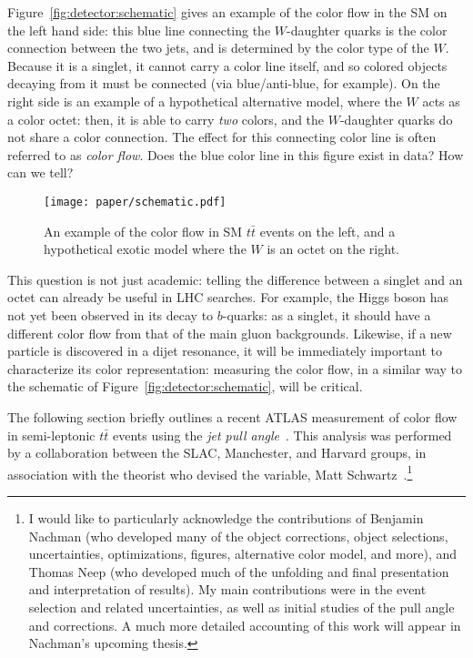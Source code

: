Figure~\ref{fig:detector:schematic} gives an example of the color flow in the SM on the left hand side: this blue line connecting the $W$-daughter quarks is the color connection between the two jets, and is determined by the color type of the $W$. Because it is a singlet, it cannot carry a color line itself, and so colored objects decaying from it must be connected (via blue/anti-blue, for example). On the right side is an example of a hypothetical alternative model, where the $W$ acts as a color octet: then, it is able to carry \textit{two} colors, and the $W$-daughter quarks do not share a color connection. The effect for this connecting color line is often referred to as \textit{color flow}. Does the blue color line in this figure exist in data? How can we tell? 


\begin{figure}
\centering
\texttt{[image: paper/schematic.pdf]}
\label{fig:color:motivation:schematic}
\caption{An example of the color flow in SM $t\bar{t}$ events on the left, and a hypothetical exotic model where the $W$ is an octet on the right.}
\end{figure}


This question is not just academic: telling the difference between a singlet and an octet can already be useful in LHC searches. For example, the Higgs boson has not yet been observed in its decay to $b$-quarks: as a singlet, it should have a different color flow from that of the main gluon backgrounds. Likewise, if a new particle is discovered in a dijet resonance, it will be immediately important to characterize its color representation: measuring the color flow, in a similar way to the schematic of Figure~\ref{fig:detector:schematic}, will be critical. 

The following section briefly outlines a recent ATLAS measurement of color flow in semi-leptonic $t\bar{t}$ events using the \textit{jet pull angle}~\cite{Aad:2015lxa,Nachman:1728288}. This analysis was performed by a collaboration between the SLAC, Manchester, and Harvard groups, in association with the theorist who devised the variable, Matt Schwartz~\cite{Gallicchio:2010sw}.\footnote{I would like to particularly acknowledge the contributions of Benjamin Nachman (who developed many of the object corrections, object selections, uncertainties, optimizations, figures, alternative color model, and more), and Thomas Neep (who developed much of the unfolding and final presentation and interpretation of results). My main contributions were in the event selection and related uncertainties, as well as initial studies of the pull angle and corrections. A much more detailed accounting of this work will appear in Nachman's upcoming thesis.}



